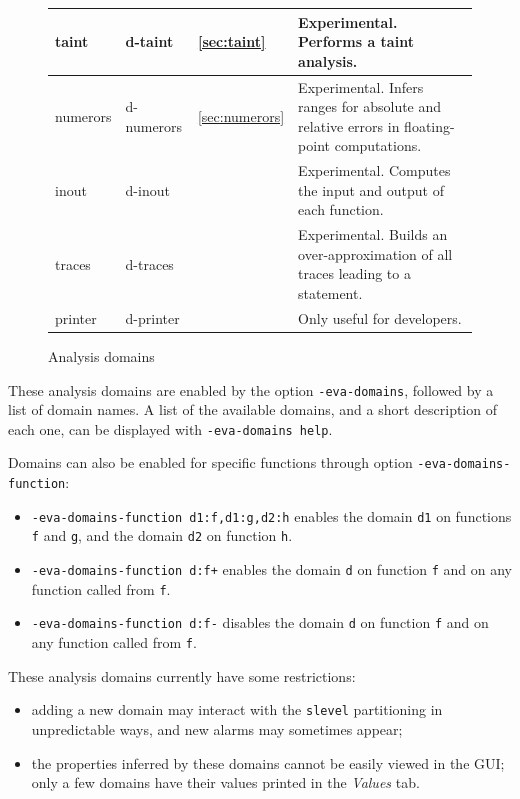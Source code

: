 \documentclass[web]{frama-c-book}
\begin{document}
\begin{figure}
\begin{tabular}{lll>{\raggedright}m{7.5cm}}
    \midrule
    taint & d-taint & \ref{sec:taint} &
    Experimental. Performs a taint analysis.
    \tabularnewline
    \midrule
    numerors & d-numerors & \ref{sec:numerors} &
    Experimental. Infers ranges for absolute and relative errors
    in floating-point computations.
    \tabularnewline
    \midrule
    inout & d-inout &  &
    Experimental. Computes the input and output of each function.
    \tabularnewline
    \midrule
    traces & d-traces &  &
    Experimental. Builds an over-approximation of all traces leading to
    a statement.
    \tabularnewline
    \midrule
    printer & d-printer &  & Only useful for developers.
    \tabularnewline
    \bottomrule
  \end{tabular}

  \caption{Analysis domains \label{fig:eva-domains}}
\end{figure}

These analysis domains are enabled by the option \texttt{-eva-domains}, followed
by a list of domain names. A list of the available domains, and a short
description of each one, can be displayed with \texttt{-eva-domains help}.

Domains can also be enabled for specific functions through option
\texttt{-eva-domains-function}:
\begin{itemize}
\item \texttt{-eva-domains-function d1:f,d1:g,d2:h} enables the domain
  \texttt{d1} on functions \lstinline+f+ and \lstinline+g+, and the domain
  \texttt{d2} on function \lstinline+h+.
\item \texttt{-eva-domains-function d:f+} enables the domain
  \texttt{d} on function \lstinline+f+ and on any function called
  from \lstinline+f+.
\item \texttt{-eva-domains-function d:f-} disables the domain
  \texttt{d} on function \lstinline+f+ and on any function called
  from \lstinline+f+.
\end{itemize}

These analysis domains currently have some restrictions:
\begin{itemize}
\item adding a new domain may interact with the \lstinline+slevel+ partitioning
  in unpredictable ways, and new alarms may sometimes appear;
\item the properties inferred by these domains cannot be easily viewed in the
  GUI; only a few domains have their values printed in the \emph{Values} tab.
\end{itemize}
\end{document}

